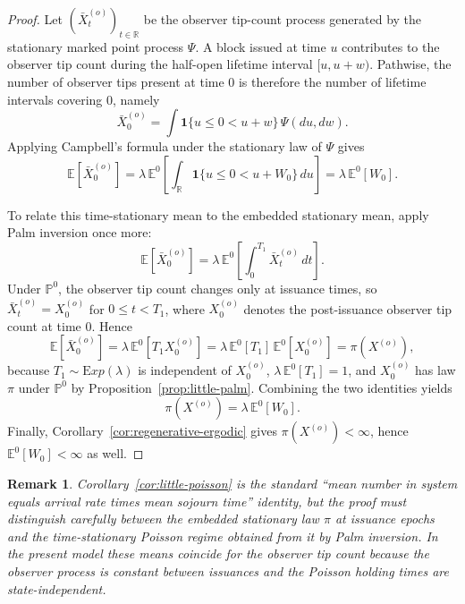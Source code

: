\documentclass[a4paper,12pt,oneside,reqno]{amsart}
\newcommand{\Exp}{{\mathrm Exp}}
\renewcommand{\P}{{\mathbb P}}
\newcommand{\E}{{\mathbb E}}
\newcommand{\1}{{\mathbf 1}}
\newtheorem{rem}[theo]{Remark}
\begin{document}
\begin{proof}
Let $(\bar X_t^{(o)})_{t\in\mathbb R}$ be the observer tip-count process generated by the stationary marked point process $\Psi$. A block issued at time $u$ contributes to the observer tip count during the half-open lifetime interval $[u,u+w)$. Pathwise, the number of observer tips present at time $0$ is therefore the number of lifetime intervals covering $0$, namely
\[
   \bar X_0^{(o)}
   = \int \1\{u\le 0 < u+w\}\,\Psi(du,dw).
\]
Applying Campbell's formula under the stationary law of $\Psi$ gives
\[
   \E[\bar X_0^{(o)}]
   = \lambda\,\E^{0}\!\left[\int_{\mathbb R}\1\{u\le 0 < u+W_0\}\,du\right]
   = \lambda\,\E^{0}[W_0].
\]

To relate this time-stationary mean to the embedded stationary mean, apply Palm inversion once more:
\[
   \E[\bar X_0^{(o)}]
   = \lambda\,\E^{0}\!\left[\int_0^{T_1} \bar X_t^{(o)}\,dt\right].
\]
Under $\P^0$, the observer tip count changes only at issuance times, so $\bar X_t^{(o)}=X_0^{(o)}$ for $0\le t<T_1$, where $X_0^{(o)}$ denotes the post-issuance observer tip count at time $0$. Hence
\[
   \E[\bar X_0^{(o)}]
   = \lambda\,\E^{0}[T_1 X_0^{(o)}]
   = \lambda\,\E^{0}[T_1]\,\E^{0}[X_0^{(o)}]
   = \pi(X^{(o)}),
\]
because $T_1\sim\Exp(\lambda)$ is independent of $X_0^{(o)}$, $\lambda\,\E^{0}[T_1]=1$, and $X_0^{(o)}$ has law $\pi$ under $\P^0$ by Proposition~\ref{prop:little-palm}. Combining the two identities yields
\[
   \pi(X^{(o)}) = \lambda\,\E^{0}[W_0].
\]
Finally, Corollary~\ref{cor:regenerative-ergodic} gives $\pi(X^{(o)})<\infty$, hence $\E^{0}[W_0]<\infty$ as well.
\end{proof}

\begin{rem}
Corollary~\ref{cor:little-poisson} is the standard ``mean number in system equals arrival rate times mean sojourn time'' identity, but the proof must distinguish carefully between the embedded stationary law $\pi$ at issuance epochs and the time-stationary Poisson regime obtained from it by Palm inversion. In the present model these means coincide for the observer tip count because the observer process is constant between issuances and the Poisson holding times are state-independent.
\end{rem}
\end{document}

